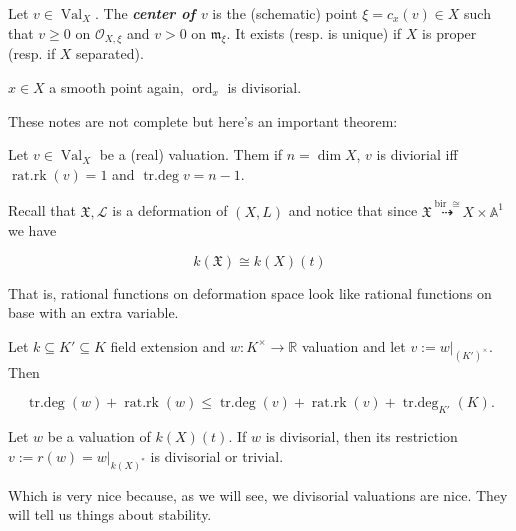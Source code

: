 \begin{definition}
\label{definition-montero-3}
Let $v \in \operatorname{Val}_X$. The
\textit{\textbf{center of $v$}} is the
(schematic) point $\xi=c_x(v) \in X$ such
that $v \geq 0$ on $\mathcal{O}_{X,\xi}$ and
$v>0$ on  $\mathfrak{m}_\xi$. It exists
(resp. is unique) if $X$ is proper (resp. if
$X$ separated).
\end{definition}

\begin{example}
\label{example-montero-2}
$x \in X$ a smooth point again,
$\operatorname{ord}_x$ is divisorial.
\end{example}

These notes are not complete but here's an
important theorem:

\begin{theorem}[Zerisky]
\label{theorem-montero-3}
Let $v \in \operatorname{Val}_X$ be a (real)
valuation. Them if  $n=\dim X$, $v$ is
diviorial iff $\operatorname{rat.rk}(v)=1$
and $\operatorname{tr.deg}v=n-1$.
\end{theorem}

\medskip{}

Recall that $\mathfrak{X},\mathcal{L}$ is a
deformation of $(X,L)$ and notice that since
$\mathfrak{X}
\overset{\operatorname{bir}\cong}{
\dashrightarrow} X \times \mathbb{A}^1$ we
have

$$
k(\mathfrak{X}) \cong k(X)(t)
$$

That is, rational functions on deformation
space look like rational functions on base
with an extra variable.

\begin{theorem}
\label{theorem-montero-4}
Let $k \subseteq K' \subseteq K$ field
extension and $w: K^\times \longrightarrow
\mathbb{R}$ valuation and let  $v:=w
|_{(K')^\times}$. Then

$$
\operatorname{tr.deg}(w)+
\operatorname{rat.rk}(w)
\leq
\operatorname{tr.deg}(v)+
\operatorname{rat.rk}(v)+
\operatorname{tr.deg}_{K'}(K).
$$

\end{theorem}

\medskip{}
Let $w$ be a valuation of $k(X)(t)$. If $w$
is divisorial, then its restriction
$v:=r(w)=w|_{k(X)^*}$ is divisorial or
trivial.

Which is very nice because, as we will see,
we divisorial valuations are nice. They will
tell us things about stability.


